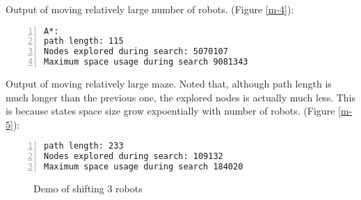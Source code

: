 \documentclass{article}
\begin{document}
Output of moving relatively large number of robots. (Figure \ref{m-4}):
\begin{lstlisting}[numbers=left]
A*:
path length: 115
Nodes explored during search: 5070107
Maximum space usage during search 9081343
\end{lstlisting}

Output of moving relatively large maze. Noted that, although path length is much longer than the previous one, the explored nodes is actually much less. This is because states space size grow expoentially with number of robots. (Figure \ref{m-5}):
\begin{lstlisting}[numbers=left]
path length: 233
Nodes explored during search: 109132
Maximum space usage during search 184020
\end{lstlisting}


\begin{figure*}[!t]
\normalsize
\centering
{}
\caption{Demo of shifting 3 robots}
\label{m-1} %
\end{figure*}
\end{document}
